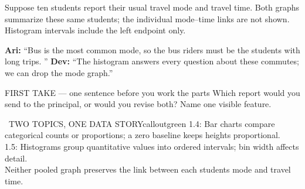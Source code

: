 \documentclass[11pt]{article}
\begin{document}
\clearpage
\normalsize
{}

Suppose ten students report their usual travel mode and travel time. Both graphs summarize these same students; the individual mode--time links are not shown. Histogram intervals include the left endpoint only.\par\smallskip \textbf{Ari:} ``Bus is the most common mode, so the bus riders must be the students with long trips. '' \textbf{Dev:} ``The histogram answers every question about these commutes; we can drop the mode graph.''\par
\begin{center}
\par\smallskip
{}
\end{center}
\begin{firsttakebox}{FIRST TAKE --- one sentence before you work the parts}
Which report would you send to the principal, or would you revise both? Name one visible feature.\par
{}
\end{firsttakebox}

\begin{callout}{\IconBook\ TWO TOPICS, ONE DATA STORY}{calloutgreen}
1.4: Bar charts compare categorical counts or proportions; a zero baseline keeps heights proportional.\\ 1.5: Histograms group quantitative values into ordered intervals; bin width affects detail.\\ Neither pooled graph preserves the link between each student\textquotesingle s mode and travel time.
\end{callout}
\end{document}
